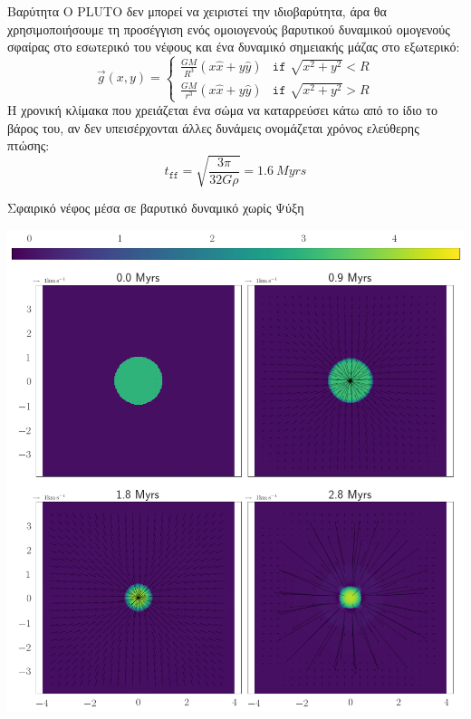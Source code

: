 \documentclass{beamer}
\begin{document}
\begin{frame}{Βαρύτητα}%
	Ο PLUTO δεν μπορεί να χειριστεί την ιδιοβαρύτητα, άρα θα χρησιμοποιήσουμε τη προσέγγιση ενός ομοιογενούς βαρυτικού δυναμικού ομογενούς σφαίρας στο εσωτερικό του νέφους και ένα δυναμικό σημειακής μάζας στο εξωτερικό:
	\begin{equation}
	\vec{g}(x,y) = 
	\begin{cases}
	\frac{GM}{R^3}(x \hat{x}+ y \hat{y}) &\texttt{if } \sqrt{x^2+y^2}<R \\
	\frac{GM}{r^3}(x \hat{x}+ y \hat{y}) &\texttt{if } \sqrt{x^2+y^2}>R
	\end{cases}
	\end{equation}
		Η χρονική κλίμακα που χρειάζεται ένα σώμα να καταρρεύσει κάτω από το ίδιο το βάρος του, αν δεν υπεισέρχονται άλλες δυνάμεις ονομάζεται χρόνος ελεύθερης πτώσης:
	\begin{equation}
	t_\texttt{ff}=\sqrt{\frac{3\pi}{32G\rho}} =  \SI{1.6}{Myrs}
	\end{equation}
\end{frame}

\begin{frame}{Σφαιρικό νέφος μέσα σε βαρυτικό δυναμικό χωρίς Ψύξη}
\begin{center}
	\includegraphics[width=0.6\linewidth]{../Document/DataImages/NoCoolGRquad}
\end{center}
\end{frame}
\end{document}
